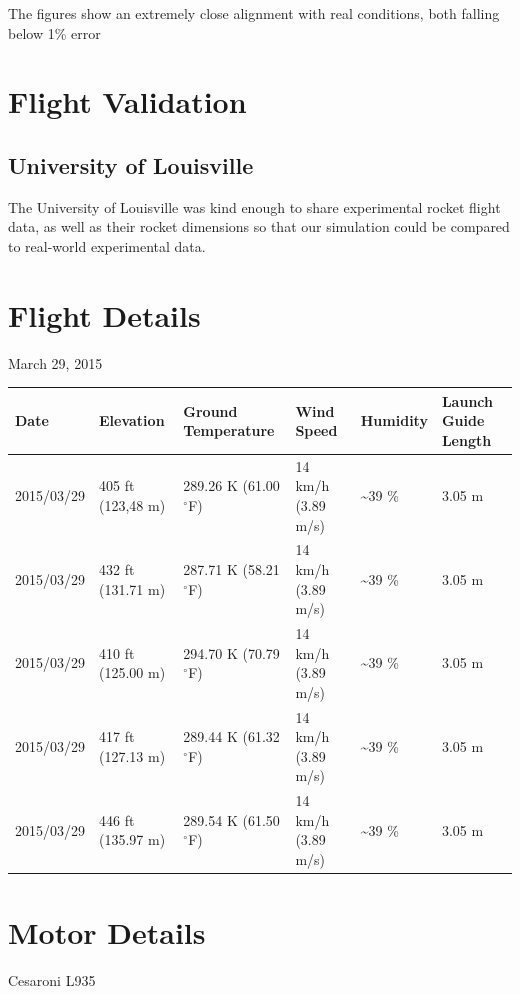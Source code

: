 \documentclass[]{book}
\begin{document}
The figures show an extremely close alignment with real conditions, both
falling below 1\% error

\section{Flight Validation}\label{flight-validation}

\subsection{University of Louisville}\label{university-of-louisville}

The University of Louisville was kind enough to share experimental
rocket flight data, as well as their rocket dimensions so that our
simulation could be compared to real-world experimental data.

\section{Flight Details}\label{flight-details}

March 29, 2015

\begin{longtable}[c]{@{}llllll@{}}
\toprule
Date & Elevation & Ground Temperature & Wind Speed & Humidity & Launch
Guide Length\tabularnewline
\midrule
\endhead
2015/03/29 & 405 ft (123,48 m) & 289.26 K (61.00 \(^\circ\)F) & 14 km/h
(3.89 m/s) & \textasciitilde{}39 \% & 3.05 m\tabularnewline
2015/03/29 & 432 ft (131.71 m) & 287.71 K (58.21 \(^\circ\)F) & 14 km/h
(3.89 m/s) & \textasciitilde{}39 \% & 3.05 m\tabularnewline
2015/03/29 & 410 ft (125.00 m) & 294.70 K (70.79 \(^\circ\)F) & 14 km/h
(3.89 m/s) & \textasciitilde{}39 \% & 3.05 m\tabularnewline
2015/03/29 & 417 ft (127.13 m) & 289.44 K (61.32 \(^\circ\)F) & 14 km/h
(3.89 m/s) & \textasciitilde{}39 \% & 3.05 m\tabularnewline
2015/03/29 & 446 ft (135.97 m) & 289.54 K (61.50 \(^\circ\)F) & 14 km/h
(3.89 m/s) & \textasciitilde{}39 \% & 3.05 m\tabularnewline
\bottomrule
\end{longtable}

\section{Motor Details}\label{motor-details}

Cesaroni L935
\end{document}
